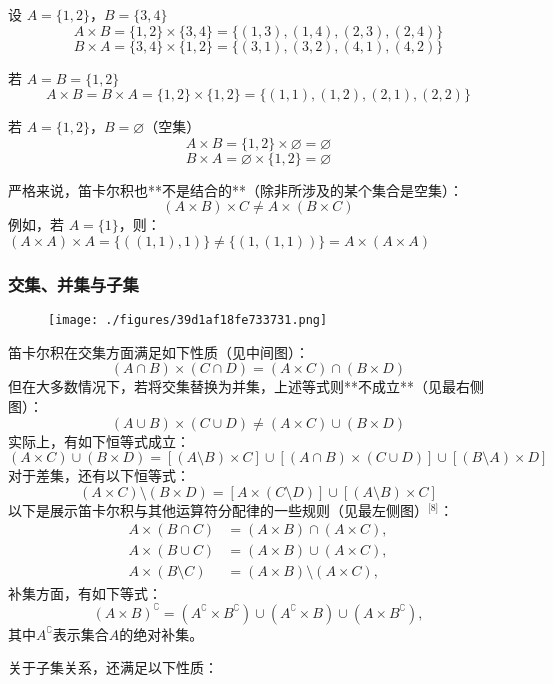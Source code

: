 设 \( A = \{1, 2\} \)，\( B = \{3, 4\} \)  
  \[
  A \times B = \{1, 2\} \times \{3, 4\} = \{(1,3), (1,4), (2,3), (2,4)\}~  
  \]  
  \[
  B \times A = \{3, 4\} \times \{1, 2\} = \{(3,1), (3,2), (4,1), (4,2)\}~  
  \]

若 \( A = B = \{1, 2\} \)  
  \[
  A \times B = B \times A = \{1, 2\} \times \{1, 2\} = \{(1,1), (1,2), (2,1), (2,2)\}~  
  \]

若 \( A = \{1, 2\} \)，\( B = \varnothing \)（空集）  
  \[
  A \times B = \{1, 2\} \times \varnothing = \varnothing ~
  \]  
  \[
  B \times A = \varnothing \times \{1, 2\} = \varnothing ~ 
  \]

严格来说，笛卡尔积也**不是结合的**（除非所涉及的某个集合是空集）：
\[
(A \times B) \times C \ne A \times (B \times C)~
\]
例如，若 \( A = \{1\} \)，则：\((A \times A) \times A = \{((1,1),1)\} \ne \{(1,(1,1))\} = A \times (A \times A)\)
\subsubsection{交集、并集与子集}
\begin{figure}[ht]
\centering
\texttt{[image: ./figures/39d1af18fe733731.png]}
\caption{} \label{fig_DKR_3}
\end{figure}
笛卡尔积在交集方面满足如下性质（见中间图）：
\[
(A \cap B) \times (C \cap D) = (A \times C) \cap (B \times D)~
\]
但在大多数情况下，若将交集替换为并集，上述等式则**不成立**（见最右侧图）：
\[
(A \cup B) \times (C \cup D) \ne (A \times C) \cup (B \times D)~
\]
实际上，有如下恒等式成立：
\[
(A \times C) \cup (B \times D) = [(A \setminus B) \times C] \cup [(A \cap B) \times (C \cup D)] \cup [(B \setminus A) \times D]~
\]
对于差集，还有以下恒等式：
\[
(A \times C) \setminus (B \times D) = [A \times (C \setminus D)] \cup [(A \setminus B) \times C]~
\]
以下是展示笛卡尔积与其他运算符分配律的一些规则（见最左侧图）\(^\text{[8]}\)：
\[
\begin{aligned}
A \times (B \cap C) &= (A \times B) \cap (A \times C), \\
A \times (B \cup C) &= (A \times B) \cup (A \times C), \\
A \times (B \setminus C) &= (A \times B) \setminus (A \times C),
\end{aligned}~
\]
补集方面，有如下等式：
\[
(A \times B)^{\complement} = (A^{\complement} \times B^{\complement}) \cup (A^{\complement} \times B) \cup (A \times B^{\complement}),~
\]
其中\( A^{\complement} \)表示集合\( A \)的绝对补集。

关于子集关系，还满足以下性质：

